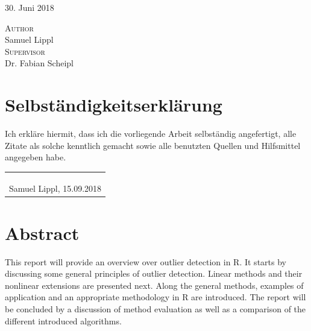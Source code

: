 \documentclass[]{report}
\theoremstyle{definition}
\theoremstyle{definition}
\theoremstyle{definition}
\theoremstyle{remark}
\begin{document}
\begin{titlepage}

\vfill


{\Large 30. Juni 2018}\\[1cm]
\begin{Large}
\textsc{Author}\\Samuel Lippl\\[1cm]
\textsc{Supervisor}\\
Dr. Fabian Scheipl
\end{Large}

\vfill

\end{titlepage}

\setcounter{page}{2}

\chapter*{Selbständigkeitserklärung}

Ich erkläre hiermit, dass ich die vorliegende Arbeit selbständig angefertigt, alle Zitate als solche kenntlich gemacht sowie alle benutzten Quellen und Hilfsmittel angegeben habe.\\

\begin{tabular}{c}
\\\\\\
\\\hline
Samuel Lippl, 15.09.2018
\end{tabular}

\chapter*{Abstract}\label{abstract}


This report will provide an overview over outlier detection in R. It
starts by discussing some general principles of outlier detection.
Linear methods and their nonlinear extensions are presented next. Along
the general methods, examples of application and an appropriate
methodology in R are introduced. The report will be concluded by a
discussion of method evaluation as well as a comparison of the different
introduced algorithms.
\end{document}
